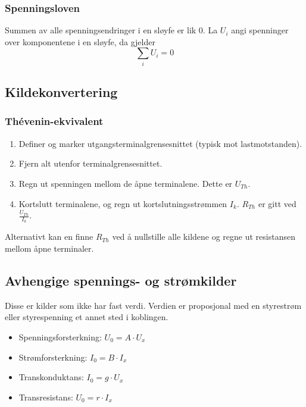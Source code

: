 \documentclass{article}
\begin{document}
\subsubsection{Spenningsloven}
Summen av alle spenningsendringer i en sløyfe er lik 0. La $U_i$ angi spenninger over komponentene i en sløyfe, da gjelder
\[\sum_i U_i = 0\]

\subsection{Kildekonvertering}
\subsubsection{Thévenin-ekvivalent}
\begin{enumerate}
    \item Definer og marker utgangsterminalgrensesnittet (typisk mot lastmotstanden).
    \item Fjern alt utenfor terminalgrensesnittet.
    \item Regn ut spenningen mellom de åpne terminalene. Dette er $U_{Th}$.
    \item Kortslutt terminalene, og regn ut kortslutningsstrømmen $I_k$. $R_{Th}$ er gitt ved $\frac{U_{Th}}{I_k}$.
\end{enumerate}
Alternativt kan en finne $R_{Th}$ ved å nullstille alle kildene og regne ut resistansen mellom åpne terminaler.

\subsection{Avhengige spennings- og strømkilder}
Disse er kilder som ikke har fast verdi. Verdien er proposjonal med en styrestrøm eller styrespenning et annet sted i koblingen.
\begin{itemize}
    \item Spenningsforsterkning: $U_0 = A \cdot U_x$
    \item Strømforsterkning: $I_0 = B \cdot I_x$
    \item Transkonduktans: $I_0 = g \cdot U_x$
    \item Transresistans: $U_0 = r \cdot I_x$
\end{itemize}
\end{document}
